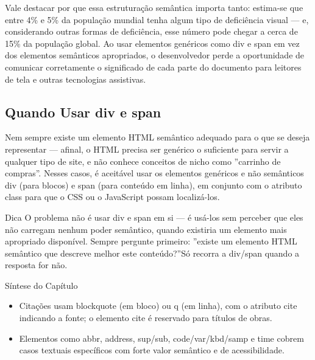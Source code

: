 Vale destacar por que essa estruturação semântica importa tanto: estima-se que entre 4\% e 5\% da população mundial tenha algum tipo de deficiência visual — e, considerando outras formas de deficiência, esse número pode chegar a cerca de 15\% da população global. Ao usar elementos genéricos como div e span em vez dos elementos semânticos apropriados, o desenvolvedor perde a oportunidade de comunicar corretamente o significado de cada parte do documento para leitores de tela e outras tecnologias assistivas.

\subsection{Quando Usar div e span}

Nem sempre existe um elemento HTML semântico adequado para o que se deseja representar — afinal, o HTML precisa ser genérico o suficiente para servir a qualquer tipo de site, e não conhece conceitos de nicho como ”carrinho de compras”. Nesses casos, é aceitável usar os elementos genéricos e não semânticos div (para blocos) e span (para conteúdo em linha), em conjunto com o atributo class para que o CSS ou o JavaScript possam localizá-los.


\begin{infobox}{Dica}
O problema não é usar div e span em si — é usá-los sem perceber que eles não carregam nenhum poder semântico, quando existiria um elemento mais apropriado disponível. Sempre pergunte primeiro: ”existe um elemento HTML semântico que descreve melhor este conteúdo?”Só recorra a div/span quando a resposta for não.
\end{infobox}

Síntese do Capítulo

\begin{itemize}
  \item Citações usam blockquote (em bloco) ou q (em linha), com o atributo cite indicando a fonte; o elemento cite é reservado para títulos de obras.
\end{itemize}

\begin{itemize}
  \item Elementos como abbr, address, sup/sub, code/var/kbd/samp e time cobrem casos textuais específicos com forte valor semântico e de acessibilidade.
\end{itemize}

